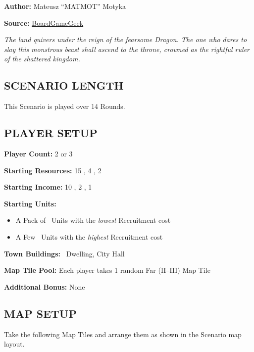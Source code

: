 
\begin{multicols*}{2}

\textbf{Author:} Mateusz ``MATMOT'' Motyka

\textbf{Source:} \href{https://boardgamegeek.com/filepage/277736/clash-scenario-the-hunt-v10}{BoardGameGeek}

\textit{The land quivers under the reign of the fearsome Dragon.
  The one who dares to slay this monstrous beast shall ascend to the throne, crowned as the rightful ruler of the shattered kingdom.
}

\subsection*{\MakeUppercase{Scenario Length}}
This Scenario is played over 14 Rounds.

\subsection*{\MakeUppercase{Player Setup}}
\textbf{Player Count:} 2 or 3

\textbf{Starting Resources:} 15 , 4 , 2 

\textbf{Starting Income:} 10 , 2 , 1 

\textbf{Starting Units:}
\begin{itemize}
  \item A Pack of \bronze\ Units with the \textit{lowest} Recruitment cost
  \item A Few \bronze\ Units with the \textit{highest} Recruitment cost
\end{itemize}

\textbf{Town Buildings:} \bronze\ Dwelling, City Hall

\textbf{Map Tile Pool:} Each player takes 1 random Far (II--III) Map Tile

\textbf{Additional Bonus:} None

\subsection*{\MakeUppercase{Map Setup}}

Take the following Map Tiles and arrange them as shown in the Scenario map layout.

\columnbreak


\end{multicols*}
